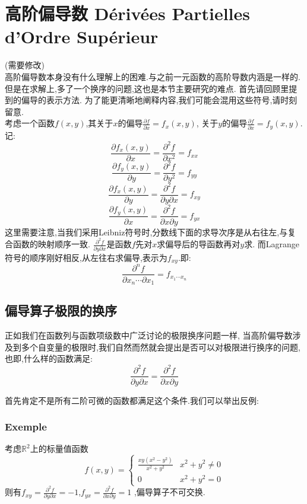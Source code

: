 \documentclass[12pt, a4paper, oneside]{ctexbook}
\newcommand{\R }{\mathbb{R}}%
\begin{document}
\section{高阶偏导数 Dérivées Partielles d'Ordre Supérieur}
  (需要修改)\\
    高阶偏导数本身没有什么理解上的困难.与之前一元函数的高阶导数内涵是一样的.
    但是在求解上,多了一个换序的问题,这也是本节主要研究的难点.
    首先请回顾里提到的偏导的表示方法.
    为了能更清晰地阐释内容,我们可能会混用这些符号,请时刻留意.\\

    考虑一个函数$f(x,y)$,其关于$x$的偏导$\frac{\partial f}{\partial x}=f_x(x,y)$,
    关于$y$的偏导$\frac{\partial f}{\partial x}=f_y(x,y)$.记:
    $$
    \frac{\partial f_x(x,y)}{\partial x}=\frac{\partial ^2f}{\partial x^2}=f_{xx}
    $$
    $$
    \frac{\partial f_y(x,y)}{\partial y}=\frac{\partial ^2f}{\partial y^2}=f_{yy}
    $$
    $$
    \frac{\partial f_x(x,y)}{\partial y}=\frac{\partial ^2f}{\partial y\partial x}=f_{xy}
    $$
    $$
    \frac{\partial f_y(x,y)}{\partial x}=\frac{\partial ^2f}{\partial x\partial y}=f_{yx}
    $$
    这里需要注意,当我们采用Leibniz符号时,分数线下面的求导次序是从右往左,与复合函数的映射顺序一致.
    $\frac{\partial ^2f}{\partial y\partial x} $是函数$f$先对$x$求偏导后的导函数再对$y$求.
    而Lagrange符号的顺序刚好相反,从左往右求偏导,表示为$f_{xy}$.即:
    $$
      \frac{\partial ^nf}{\partial x_n\cdots \partial x_1} = f_{x_1\cdots x_n}
    $$
  \subsection{偏导算子极限的换序}
  正如我们在函数列与函数项级数中广泛讨论的极限换序问题一样,
  当高阶偏导数涉及到多个自变量的极限时,我们自然而然就会提出是否可以对极限进行换序的问题,也即,什么样的函数满足:
  $$
    \frac{\partial ^2f}{\partial y\partial x} =\frac{\partial ^2f}{\partial x\partial y} 
  $$
  
  首先肯定不是所有二阶可微的函数都满足这个条件.我们可以举出反例:
  \subsubsection{Exemple}
  考虑$\R^2$上的标量值函数
  $$
    f(x,y)=
    \begin{cases}
      \frac{xy(x^2-y^2)}{x^2+y^2} &x^2+y^2\neq 0\\
      0 &x^2+y^2= 0
      \end{cases}
  $$
  则有$f_{xy}=\frac{\partial ^2f}{\partial y\partial x}=-1$,$f_{yx}=\frac{\partial ^2f}{\partial x\partial y}=1$ ,偏导算子不可交换.\\
\end{document}
